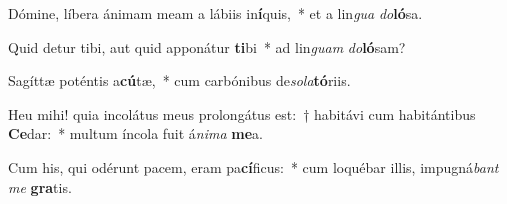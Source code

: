 \item Dómine, líbera ánimam meam a lábiis in\textbf{í}quis,~* et a lin\textit{gua} \textit{do}\textbf{ló}sa.
\item Quid detur tibi, aut quid apponátur \textbf{ti}bi~* ad lin\textit{guam} \textit{do}\textbf{ló}sam?
\item Sagíttæ poténtis a\textbf{cú}tæ,~* cum carbónibus de\tinyhspace\textit{sola}\textbf{tó}riis.
\item Heu mihi! quia incolátus meus prolongátus est:~† habitávi cum habitántibus \textbf{Ce}dar:~* multum íncola fuit á\textit{nima} \textbf{me}a.
\item Cum his, qui odérunt pacem, eram pa\textbf{cí}ficus:~* cum loquébar illis, impugná\textit{bant} \textit{me} \textbf{gra}tis.
